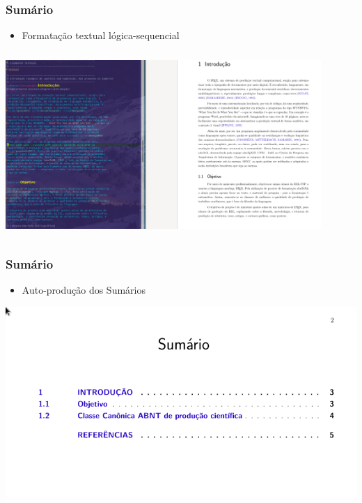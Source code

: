 \documentclass{beamer}
\begin{document}
	\begin{frame}
	  \frametitle{Sumário}

	   \begin{itemize}
	   \item Formatação textual lógica-sequencial
	  \end{itemize}

	 \begin{center}
	    \includegraphics[width=12cm,height=7cm]{../Imagens/A2I41.png}
	  \end{center}

	\end{frame}

	\begin{frame}
	  \frametitle{Sumário}

	   \begin{itemize}
	  \item Auto-produção dos Sumários
	  \end{itemize}

	 \begin{center}
	   \includegraphics[scale=0.4]{../Imagens/A2I42.png}
	  \end{center}

	\end{frame}
\end{document}
